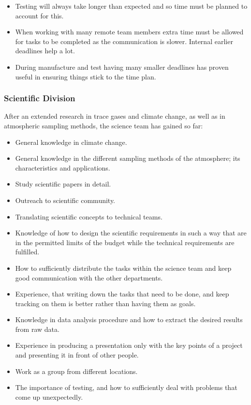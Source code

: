\begin{itemize}
    \item Testing will always take longer than expected and so time must be planned to account for this.
    \item When working with many remote team members extra time must be allowed for tasks to be completed as the communication is slower. Internal earlier deadlines help a lot.
    \item During manufacture and test having many smaller deadlines has proven useful in ensuring things stick to the time plan.
\end{itemize}

\subsubsection{Scientific Division}
After an extended research in trace gases and climate change, as well as in atmospheric sampling methods, the science team has gained so far: 
\begin{itemize}
    \item General knowledge in climate change.
    \item General knowledge in the different sampling methods of the atmosphere; its characteristics and applications.
    \item Study scientific papers in detail.
    \item Outreach to scientific community.
    \item Translating scientific concepts to technical teams.
    \item Knowledge of how to design the scientific requirements in such a way that are in the permitted limits of the budget while the technical requirements are fulfilled.   
    \item How to sufficiently distribute the tasks within the science team and keep good communication with the other departments. 
    \item Experience, that writing down the tasks that need to be done, and keep tracking on them is better rather than having them as goals.   
    \item Knowledge in data analysis procedure and how to extract the desired results from raw data.
    \item Experience in producing a presentation only with the key points of a project and presenting it in front of other people.
    \item Work as a group from different locations.
    \item The importance of testing, and how to sufficiently deal with problems that come up unexpectedly.
     
\end{itemize}


